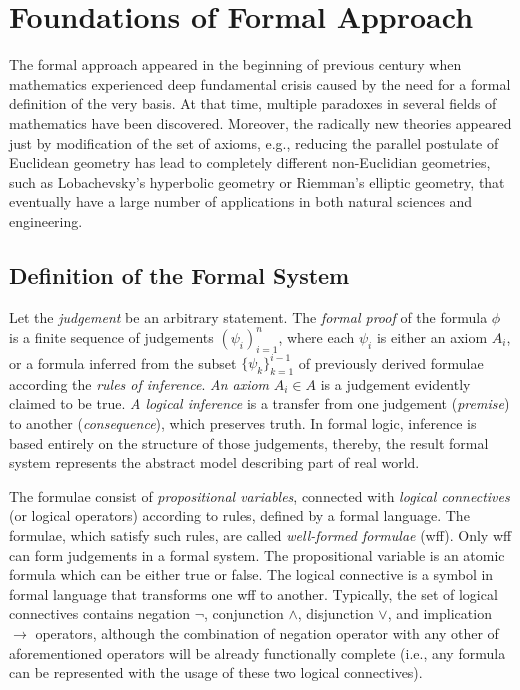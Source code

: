 \documentclass[article]{aaltoseries}
\begin{document}


\section{Foundations of Formal Approach}
\label{sec:formal_theory}

The formal approach appeared in the beginning of previous century when mathematics experienced deep fundamental crisis caused by the need for a formal definition of the very basis. At that time, multiple paradoxes in several fields of mathematics have been discovered. Moreover, the radically new theories appeared just by modification of the set of axioms, e.g., reducing the parallel postulate of Euclidean geometry has lead to completely different non-Euclidian geometries, such as Lobachevsky's hyperbolic geometry or Riemman's elliptic geometry, that eventually have a large number of applications in both natural sciences and engineering.


\subsection{Definition of the Formal System}
\label{sec:definitions}


Let the \textit{judgement} be an arbitrary statement. The \textit{formal proof} of the formula $\phi$ is a finite sequence of judgements $ ( \psi_i )_{i=1}^{n} $, where each $\psi_i$ is either an axiom $A_i$, or a formula inferred from the subset $\{ \psi_k \}_{k=1}^{i-1}$ of previously derived formulae according the \textit{rules of inference}. \textit{An axiom} $A_i \in A$ is a judgement evidently claimed to be true. \textit{A logical inference} is a transfer from one judgement (\textit{premise}) to another (\textit{consequence}), which preserves truth. In formal logic, inference is based entirely on the structure of those judgements, thereby, the result formal system represents the abstract model describing part of real world.

The formulae consist of \textit{propositional variables}, connected with \textit{logical connectives} (or logical operators) according to rules, defined by a formal language. The formulae, which satisfy such rules, are called \textit{well-formed formulae} (wff). Only wff can form judgements in a formal system. The propositional variable is an atomic formula which can be either true or false. The logical connective is a symbol in formal language that transforms one wff to another. Typically, the set of logical connectives contains negation $\neg$, conjunction $\land$, disjunction $\lor$, and implication $\rightarrow$ operators, although the combination of negation operator with any other of aforementioned operators will be already functionally complete (i.e., any formula can be represented with the usage of these two logical connectives).
\end{document}
